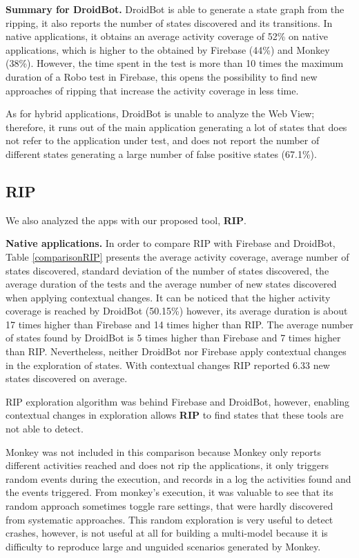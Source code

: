 \textbf{Summary for DroidBot.} DroidBot is able to generate a state graph from the ripping, it also reports the number of states discovered and its transitions. In native applications, it obtains an average activity coverage of 52\% on native applications, which is higher to the obtained by Firebase (44\%) and Monkey (38\%). However, the time spent in the test is more than 10 times the maximum duration of a Robo test in Firebase, this opens the possibility to find new approaches of ripping that increase the activity coverage in less time.  

As for hybrid applications, DroidBot is unable to analyze the Web View; therefore, it runs out of the main application generating a lot of states that does not refer to the application under test, and does not report the number of different states generating a large number of false positive states (67.1\%). 
\subsection{RIP}
We also analyzed the apps with our proposed tool, \textbf{RIP}.
 
\textbf{Native applications.} In order to compare RIP with Firebase and DroidBot, Table \ref{comparisonRIP} presents the average activity coverage, average number of states discovered, standard deviation of the number of states discovered, the average duration of the tests and the average number of new states discovered when applying contextual changes. It can be noticed that the higher activity coverage is reached by DroidBot (50.15\%) however, its average duration is about 17 times higher than Firebase and 14 times higher than RIP. The average number of states found by DroidBot is 5 times higher than Firebase and 7 times higher than RIP. 
Nevertheless, neither DroidBot nor Firebase apply contextual changes in the exploration of states. With contextual changes RIP reported 6.33 new states discovered on average.

RIP exploration algorithm was behind Firebase and DroidBot, however, enabling contextual changes in exploration allows \textbf{RIP} to find states that these tools are not able to detect.

Monkey was not included in this comparison because Monkey only reports different activities reached and does not rip the applications, it only triggers random events during the execution, and records in a log the activities found and the events triggered. From monkey's execution, it was valuable to see that its random approach sometimes toggle rare settings, that were hardly discovered from systematic approaches. This random exploration is very useful to detect crashes, however, is not  useful  at all for building a multi-model because it is difficulty to reproduce large and unguided scenarios generated by Monkey.


